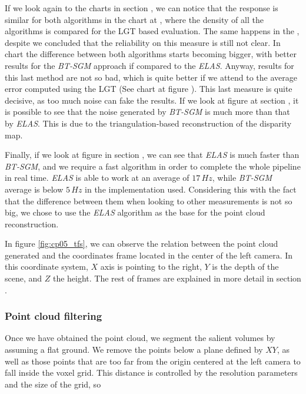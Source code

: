 If we look again to the charts in section , we can notice that the response is similar for both algorithms in the chart at , where the density of all the algorithms is compared for the \acs{LGT} based evaluation. The same happens in the , despite we concluded that the reliability on this measure is still not clear. In chart  the difference between both algorithms starts becoming bigger, with better results for the \emph{BT-SGM} approach if compared to the \emph{ELAS}. Anyway, results for this last method are not so bad, which is quite better if we attend to the average error computed using the \acs{LGT} (See chart at figure ). This last measure is quite decisive, as too much noise can fake the results. If we look at figure  at section , it is possible to see that the noise generated by \emph{BT-SGM} is much more than that by \emph{ELAS}. This is due to the triangulation-based reconstruction of the disparity map.

Finally, if we look at figure  in section , we can see that \emph{ELAS} is much faster than \emph{BT-SGM}, and we require a fast algorithm in order to complete the whole pipeline in real time. \emph{ELAS} is able to work at an average of $17\,Hz$, while \emph{BT-SGM} average is below $5\,Hz$ in the implementation used. Considering this with the fact that the difference between them when looking to other measurements is not so big, we chose to use the \emph{ELAS} algorithm as the base for the point cloud reconstruction.

In figure \ref{fig:cp05_tfs}, we can observe the relation between the point cloud generated and the coordinates frame located in the center of the left camera. In this coordinate system, $X$ axis is pointing to the right, $Y$ is the depth of the scene, and $Z$ the height. The rest of frames are explained in more detail in section .

\subsubsection{Point cloud filtering}\label{ch:chapter05_01_01_01}

Once we have obtained the point cloud, we segment the salient volumes by assuming a flat ground. We remove the points below a plane defined by $XY$, as well as those points that are too far from the origin centered at the left camera to fall inside the voxel grid. This distance is controlled by the resolution parameters and the size of the grid, so

